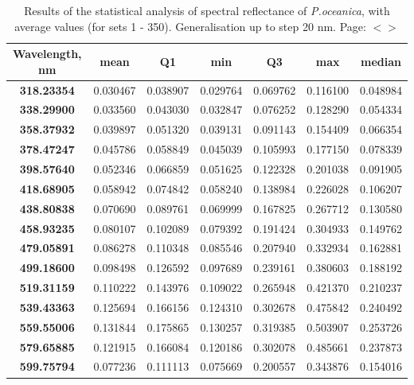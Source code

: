 \documentclass[11pt]{article}
\begin{document}
\begin{table}[htbp]
	\caption{Results of the statistical analysis of spectral reflectance of \textit{P.oceanica}, with average values (for sets 1 - 350). Generalisation up to step 20 nm. Page: $<$\pageref{page-40}$>$}\label{tab:4.1}
	\begin{center}
	\begin{tabular}{|c|c|c|c|c|c|c|}
	\hline
	Wavelength, nm & mean & Q1 & min & Q3 & max & median \\ \hline
		\textbf{318.23354} & 0.030467 & 0.038907 & 0.029764 & 0.069762 & 0.116100 & 0.048984 \\ \hline
		\textbf{338.29900} & 0.033560 & 0.043030 & 0.032847 & 0.076252 & 0.128290 & 0.054334 \\ \hline
		\textbf{358.37932} & 0.039897 & 0.051320 & 0.039131 & 0.091143 & 0.154409 & 0.066354 \\ \hline
		\textbf{378.47247} & 0.045786 & 0.058849 & 0.045039 & 0.105993 & 0.177150 & 0.078339 \\ \hline
		\textbf{398.57640} & 0.052346 & 0.066859 & 0.051625 & 0.122328 & 0.201038 & 0.091905 \\ \hline
		\textbf{418.68905} & 0.058942 & 0.074842 & 0.058240 & 0.138984 & 0.226028 & 0.106207 \\ \hline
		\textbf{438.80838} & 0.070690 & 0.089761 & 0.069999 & 0.167825 & 0.267712 & 0.130580 \\ \hline
		\textbf{458.93235} & 0.080107 & 0.102089 & 0.079392 & 0.191424 & 0.304933 & 0.149762 \\ \hline
		\textbf{479.05891} & 0.086278 & 0.110348 & 0.085546 & 0.207940 & 0.332934 & 0.162881 \\ \hline
		\textbf{499.18600} & 0.098498 & 0.126592 & 0.097689 & 0.239161 & 0.380603 & 0.188192 \\ \hline
		\textbf{519.31159} & 0.110222 & 0.143976 & 0.109022 & 0.265948 & 0.421370 & 0.210237 \\ \hline
		\textbf{539.43363} & 0.125694 & 0.166156 & 0.124310 & 0.302678 & 0.475842 & 0.240492 \\ \hline
		\textbf{559.55006} & 0.131844 & 0.175865 & 0.130257 & 0.319385 & 0.503907 & 0.253726 \\ \hline
		\textbf{579.65885} & 0.121915 & 0.166084 & 0.120186 & 0.302078 & 0.485661 & 0.237873 \\ \hline
		\textbf{599.75794} & 0.077236 & 0.111113 & 0.075669 & 0.200557 & 0.343876 & 0.154016 \\ \hline

\end{tabular}
\end{center}
\end{table}
\end{document}
